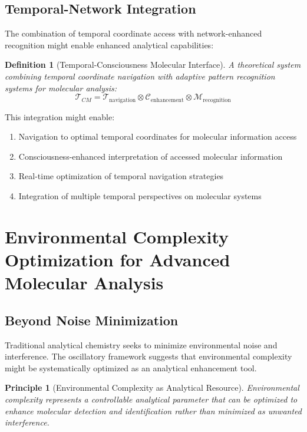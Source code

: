 \documentclass[11pt,a4paper]{article}
\newtheorem{definition}[theorem]{Definition}
\newtheorem{principle}[theorem]{Principle}
\theoremstyle{remark}
\begin{document}
\subsection{Temporal-Network Integration}

The combination of temporal coordinate access with network-enhanced recognition might enable enhanced analytical capabilities:

\begin{definition}[Temporal-Consciousness Molecular Interface]
A theoretical system combining temporal coordinate navigation with adaptive pattern recognition systems for molecular analysis:
$$\mathcal{T}_{CM} = \mathcal{T}_{\text{navigation}} \otimes \mathcal{C}_{\text{enhancement}} \otimes \mathcal{M}_{\text{recognition}}$$
\end{definition}

This integration might enable:
\begin{enumerate}
\item Navigation to optimal temporal coordinates for molecular information access
\item Consciousness-enhanced interpretation of accessed molecular information
\item Real-time optimization of temporal navigation strategies
\item Integration of multiple temporal perspectives on molecular systems
\end{enumerate}

\section{Environmental Complexity Optimization for Advanced Molecular Analysis}

\subsection{Beyond Noise Minimization}

Traditional analytical chemistry seeks to minimize environmental noise and interference. The oscillatory framework suggests that environmental complexity might be systematically optimized as an analytical enhancement tool.

\begin{principle}[Environmental Complexity as Analytical Resource]
Environmental complexity represents a controllable analytical parameter that can be optimized to enhance molecular detection and identification rather than minimized as unwanted interference.
\end{principle}
\end{document}

